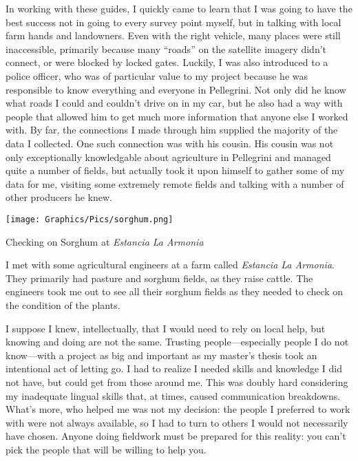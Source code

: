 In working with these guides, I quickly came to learn that I was going to have the best success not in going to every survey point myself, but in talking with local farm hands and landowners. Even with the right vehicle, many places were still inaccessible, primarily because many ``roads'' on the satellite imagery didn’t connect, or were blocked by locked gates. Luckily, I was also introduced to a police officer, who was of particular value to my project because he was responsible to know everything and everyone in Pellegrini. Not only did he know what roads I could and couldn’t drive on in my car, but he also had a way with people that allowed him to get much more information that anyone else I worked with. By far, the connections I made through him supplied the majority of the data I collected. One such connection was with his cousin. His cousin was not only exceptionally knowledgable about agriculture in Pellegrini and managed quite a number of fields, but actually took it upon himself to gather some of my data for me, visiting some extremely remote fields and talking with a number of other producers he knew.

\begin{ssfigure}
  \centering
  \texttt{[image: Graphics/Pics/sorghum.png]}
  \caption{Checking on Sorghum at \textit{Estancia La Armonia}}
  \label{pic:sorghum}
  \medskip
  \small
  I met with some agricultural engineers at a farm called \textit{Estancia La Armonia}. They primarily had pasture and sorghum fields, as they raise cattle. The engineers took me out to see all their sorghum fields as they needed to check on the condition of the plants.
\end{ssfigure}

I suppose I knew, intellectually, that I would need to rely on local help, but knowing and doing are not the same. Trusting people---especially people I do not know---with a project as big and important as my master’s thesis took an intentional act of letting go. I had to realize I needed skills and knowledge I did not have, but could get from those around me. This was doubly hard considering my inadequate lingual skills that, at times, caused communication breakdowns. What’s more, who helped me was not my decision: the people I preferred to work with were not always available, so I had to turn to others I would not necessarily have chosen. Anyone doing fieldwork must be prepared for this reality: you can’t pick the people that will be willing to help you.


